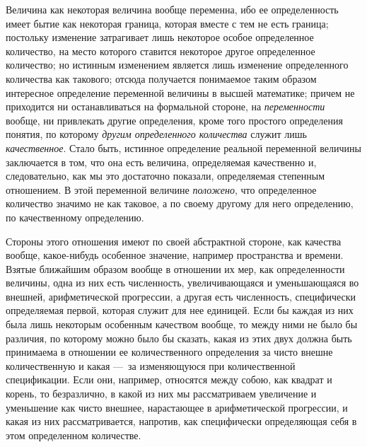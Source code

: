 Величина как некоторая величина вообще переменна, ибо ее определенность
имеет бытие как некоторая граница, которая вместе с тем не есть граница;
постольку изменение затрагивает лишь некоторое особое определенное
количество, на место которого ставится некоторое другое определенное
количество; но истинным изменением является лишь изменение определенного
количества как такового; отсюда получается понимаемое таким образом
интересное определение переменной величины в высшей математике; причем не
приходится ни останавливаться на формальной стороне, на
{\em переменности} вообще, ни привлекать другие
определения, кроме того простого определения понятия, по которому
{\em другим определенного количества} служит лишь
{\em качественное}. Стало быть, истинное определение
реальной переменной величины заключается в том, что она есть величина,
определяемая качественно и, следовательно, как мы это достаточно показали,
определяемая степенным отношением. В этой переменной величине
{\em положено}, что определенное количество значимо не
как таковое, а по своему другому для него определению, по качественному
определению.

Стороны этого отношения имеют по своей абстрактной стороне, как качества
вообще, какое-нибудь особенное значение, например пространства и времени.
Взятые ближайшим образом вообще в отношении их мер, как определенности
величины, одна из них есть численность, увеличивающаяся и уменьшающаяся во
внешней, арифметической прогрессии, а другая есть численность, специфически
определяемая первой, которая служит для нее единицей. Если бы каждая из них
была лишь некоторым особенным качеством вообще, то между ними не было бы
различия, по которому можно было бы сказать, какая из этих двух должна быть
принимаема в отношении ее количественного определения за чисто внешне
количественную и какая —~за изменяющуюся при количественной спецификации.
Если они, например, относятся между собою, как квадрат и корень, то
безразлично, в какой из них мы рассматриваем увеличение и уменьшение как
чисто внешнее, нарастающее в арифметической прогрессии, и какая из них
рассматривается, напротив, как специфически определяющая себя в этом
определенном количестве.

